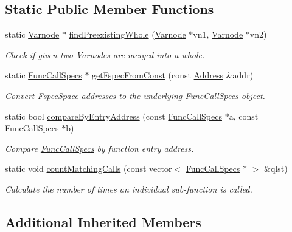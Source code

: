 \subsection*{Static Public Member Functions}
\begin{DoxyCompactItemize}
\item 
static \mbox{\hyperlink{class_varnode}{Varnode}} $\ast$ \mbox{\hyperlink{class_func_call_specs_a9a59b9321b66bc9f23e69d2ef729258c}{find\+Preexisting\+Whole}} (\mbox{\hyperlink{class_varnode}{Varnode}} $\ast$vn1, \mbox{\hyperlink{class_varnode}{Varnode}} $\ast$vn2)
\begin{DoxyCompactList}\small\item\em Check if given two Varnodes are merged into a whole. \end{DoxyCompactList}\item 
static \mbox{\hyperlink{class_func_call_specs}{Func\+Call\+Specs}} $\ast$ \mbox{\hyperlink{class_func_call_specs_aa1d084c81a9ae8656d7ef79c84398dc8}{get\+Fspec\+From\+Const}} (const \mbox{\hyperlink{class_address}{Address}} \&addr)
\begin{DoxyCompactList}\small\item\em Convert \mbox{\hyperlink{class_fspec_space}{Fspec\+Space}} addresses to the underlying \mbox{\hyperlink{class_func_call_specs}{Func\+Call\+Specs}} object. \end{DoxyCompactList}\item 
static bool \mbox{\hyperlink{class_func_call_specs_a57f3844d92136d3ab6b67ea9ea316aa7}{compare\+By\+Entry\+Address}} (const \mbox{\hyperlink{class_func_call_specs}{Func\+Call\+Specs}} $\ast$a, const \mbox{\hyperlink{class_func_call_specs}{Func\+Call\+Specs}} $\ast$b)
\begin{DoxyCompactList}\small\item\em Compare \mbox{\hyperlink{class_func_call_specs}{Func\+Call\+Specs}} by function entry address. \end{DoxyCompactList}\item 
static void \mbox{\hyperlink{class_func_call_specs_aab6fc72a11289af288ec65f216d7a45b}{count\+Matching\+Calls}} (const vector$<$ \mbox{\hyperlink{class_func_call_specs}{Func\+Call\+Specs}} $\ast$ $>$ \&qlst)
\begin{DoxyCompactList}\small\item\em Calculate the number of times an individual sub-\/function is called. \end{DoxyCompactList}\end{DoxyCompactItemize}
\subsection*{Additional Inherited Members}


